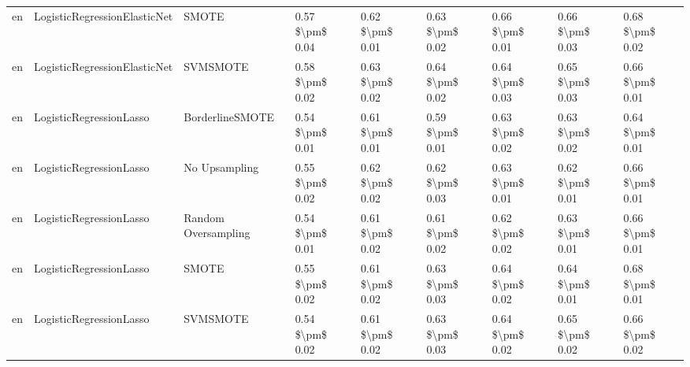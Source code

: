 \begin{tabular}{lllllllll}
      en &    LogisticRegressionElasticNet &                         SMOTE & 0.57 \$\textbackslash pm\$ 0.04 &           0.62 \$\textbackslash pm\$ 0.01 &       0.63 \$\textbackslash pm\$ 0.02 &        0.66 \$\textbackslash pm\$ 0.01 &                         0.66 \$\textbackslash pm\$ 0.03 &     0.68 \$\textbackslash pm\$ 0.02 \\
      en &    LogisticRegressionElasticNet &                      SVMSMOTE & 0.58 \$\textbackslash pm\$ 0.02 &           0.63 \$\textbackslash pm\$ 0.02 &       0.64 \$\textbackslash pm\$ 0.02 &        0.64 \$\textbackslash pm\$ 0.03 &                         0.65 \$\textbackslash pm\$ 0.03 &     0.66 \$\textbackslash pm\$ 0.01 \\
      en &         LogisticRegressionLasso &               BorderlineSMOTE & 0.54 \$\textbackslash pm\$ 0.01 &           0.61 \$\textbackslash pm\$ 0.01 &       0.59 \$\textbackslash pm\$ 0.01 &        0.63 \$\textbackslash pm\$ 0.02 &                         0.63 \$\textbackslash pm\$ 0.02 &     0.64 \$\textbackslash pm\$ 0.01 \\
      en &         LogisticRegressionLasso &                 No Upsampling & 0.55 \$\textbackslash pm\$ 0.02 &           0.62 \$\textbackslash pm\$ 0.02 &       0.62 \$\textbackslash pm\$ 0.03 &        0.63 \$\textbackslash pm\$ 0.01 &                         0.62 \$\textbackslash pm\$ 0.01 &     0.66 \$\textbackslash pm\$ 0.01 \\
      en &         LogisticRegressionLasso &           Random Oversampling & 0.54 \$\textbackslash pm\$ 0.01 &           0.61 \$\textbackslash pm\$ 0.02 &       0.61 \$\textbackslash pm\$ 0.02 &        0.62 \$\textbackslash pm\$ 0.02 &                         0.63 \$\textbackslash pm\$ 0.01 &     0.66 \$\textbackslash pm\$ 0.01 \\
      en &         LogisticRegressionLasso &                         SMOTE & 0.55 \$\textbackslash pm\$ 0.02 &           0.61 \$\textbackslash pm\$ 0.02 &       0.63 \$\textbackslash pm\$ 0.03 &        0.64 \$\textbackslash pm\$ 0.02 &                         0.64 \$\textbackslash pm\$ 0.01 &     0.68 \$\textbackslash pm\$ 0.01 \\
      en &         LogisticRegressionLasso &                      SVMSMOTE & 0.54 \$\textbackslash pm\$ 0.02 &           0.61 \$\textbackslash pm\$ 0.02 &       0.63 \$\textbackslash pm\$ 0.03 &        0.64 \$\textbackslash pm\$ 0.02 &                         0.65 \$\textbackslash pm\$ 0.02 &     0.66 \$\textbackslash pm\$ 0.02 \\

\end{tabular}
